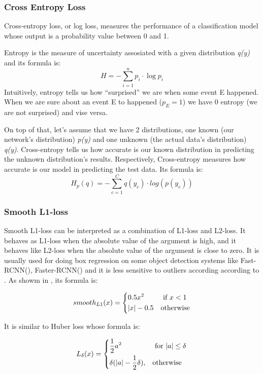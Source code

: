 \subsubsection{Cross Entropy Loss}
Cross-entropy loss, or log loss, measures the performance of a classification model whose output is a probability value between 0 and 1. \par
Entropy is the measure of uncertainty assosiated with a given distribution \textit{q(y)} and its formula is: 
\[ H = -\sum_{i=1}^n p_i \cdot \log p_i \]
Intuitively, entropy tells us how ``surprised'' we are when some event E happened. When we are sure about an event E to happened ($ p_E = 1$)
we have 0 entropy (we are not surprised) and vise versa. \par
On top of that, let's assume that we have 2 distributions, one known (our network's distribution) \textit{p(y)} and one unknown (the actual
data's distribution) \textit{q(y)}. Cross-entropy tells us how accurate is our known distribution in predicting the unknown distribution's
results. Respectively, Cross-entropy measures how accurate is our model in predicting the test data. Its formula is:
\[ H_p(q) = - \sum_{c=1}^C q(y_c) \cdot log(p(y_c)) \]

\subsubsection{Smooth L1-loss}

Smooth L1-loss can be interpreted as a combination of L1-loss and L2-loss. It behaves as L1-loss when the absolute
value of the argument is high, and it behaves like L2-loss when the absolute value of the argument is close to zero.
It is usually used for doing box regression on some object detection systems like Fast-RCNN(\cite{Girshick:2015:FR:2919332.2920125}),
Faster-RCNN(\cite{Ren:2015:FRT:2969239.2969250}) and it is less sensitive to outliers according according to \cite{Girshick:2015:FR:2919332.2920125}.
As showm in \cite{Girshick:2015:FR:2919332.2920125}, its formula is:

\[ smooth_{L1}(x) = \begin{dcases}
    0.5x^2 & \text{ if } x < 1 \\
    |x| - 0.5 & \text{otherwise}
  \end{dcases}\]

It is similar to Huber loss whose formula is:

\[
L_{\delta}(x) = \begin{dcases}
    \frac{1}{2}a^2 & \text{ for } |a| \le \delta \\
\delta(|a| - \frac{1}{2}\delta), & \text{otherwise}
\end{dcases}
\]

